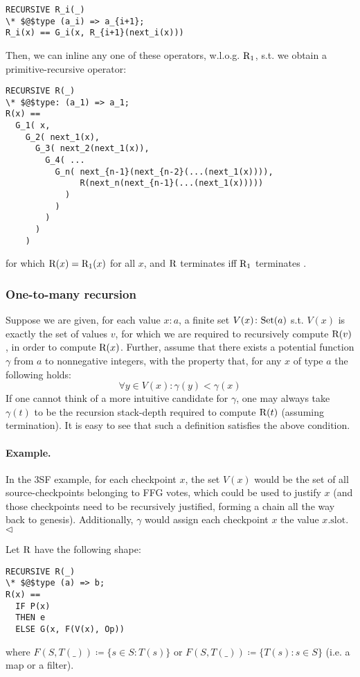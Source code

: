 \begin{lstlisting}[language=tla,columns=fullflexible]
RECURSIVE R_i(_)
\* $@$type (a_i) => a_{i+1};
R_i(x) == G_i(x, R_{i+1}(next_i(x)))
\end{lstlisting}
%
Then, we can inline any one of these operators, w.l.o.g. $\mathrm{R}_1$, s.t. we obtain a primitive-recursive operator:
\begin{lstlisting}[language=tla,columns=fullflexible]
RECURSIVE R(_) 
\* $@$type: (a_1) => a_1;
R(x) ==
  G_1( x, 
    G_2( next_1(x),
      G_3( next_2(next_1(x)),
        G_4( ...
          G_n( next_{n-1}(next_{n-2}(...(next_1(x)))), 
               R(next_n(next_{n-1}(...(next_1(x)))))
            )
          )
        )
      )
    )
\end{lstlisting}
for which $\mathrm{R}(x) = \mathrm{R}_1(x)$ for all $x$, and $\mathrm{R}$ terminates iff $\mathrm{R}_1$ terminates
.

\subsubsection{One-to-many recursion}

Suppose we are given, for each value $x: a$, a finite set $V(x)\colon \mathrm{Set}(a)$ s.t. $V(x)$ is exactly the set of values $v$, for which we are required to recursively compute $\mathrm{R}(v)$, in order to compute $\mathrm{R}(x)$. 
Further, assume that there exists a potential function $\gamma$ from $a$ to nonnegative integers, with the property that, for any $x$ of type $a$ the following holds:
\[
\forall y \in V(x)\colon \gamma(y) < \gamma(x) 
\]
%
If one cannot think of a more intuitive candidate for $\gamma$, one may always take $\gamma(t)$ to be the recursion stack-depth required to compute $\mathrm{R}(t)$ (assuming termination). It is easy to see that such a definition satisfies the above condition.

\paragraph{Example.} In the 3SF example, for each checkpoint $x$, the set $V(x)$ would be the set of all source-checkpoints belonging to FFG votes, which could be used to justify $x$ (and those checkpoints need to be recursively justified, forming a chain all the way back to genesis). Additionally, $\gamma$ would assign each checkpoint $x$ the value $x.\text{slot}$. \hfill $\triangleleft$

\noindent Let $\mathrm{R}$ have the following shape:
\begin{lstlisting}[language=tla,columns=fullflexible]
RECURSIVE R(_)
\* $@$type (a) => b;
R(x) ==
  IF P(x)
  THEN e
  ELSE G(x, F(V(x), Op))
\end{lstlisting}
%
where $F(S, T(\_)) \coloneqq \{s \in S\colon T(s)\}$ or $F(S, T(\_)) \coloneqq \{T(s)\colon s \in S\}$ (i.e. a map or a filter).
%
